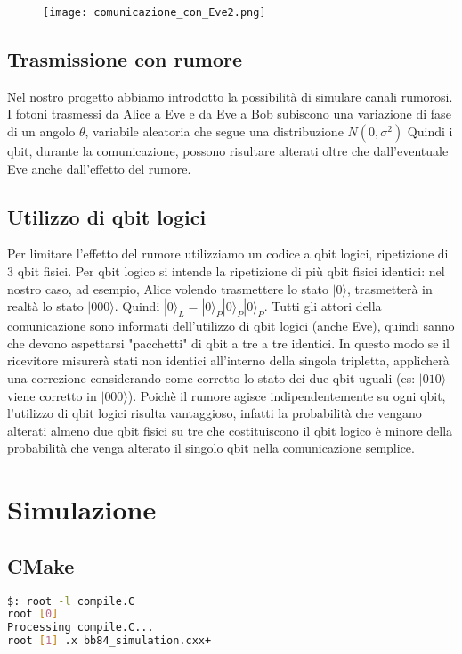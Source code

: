 \documentclass[11 pt, a4paper]{article}
\begin{document}
\begin{figure}[htbp!]
\centering
\texttt{[image: comunicazione\_con\_Eve2.png]}
\end{figure}

\subsection{Trasmissione con rumore}
Nel nostro progetto abbiamo introdotto la possibilità di simulare canali rumorosi. I fotoni trasmessi da Alice a Eve e da Eve a Bob subiscono una variazione di fase di un angolo $\theta$, variabile aleatoria che segue una distribuzione $N(0,\sigma^2)$
Quindi i qbit, durante la comunicazione, possono risultare alterati oltre che dall'eventuale Eve anche dall'effetto del rumore.

\subsection{Utilizzo di qbit logici}
Per limitare l'effetto del rumore utilizziamo un codice a qbit logici, ripetizione di 3 qbit fisici.
Per qbit logico si intende la ripetizione di più qbit fisici identici: nel nostro caso, ad esempio, Alice volendo trasmettere lo stato $|0\rangle$, trasmetterà in realtà lo stato $|000\rangle$. Quindi $|0\rangle_L = |0\rangle_P|0\rangle_P|0\rangle_P$.
Tutti gli attori della comunicazione sono informati dell'utilizzo di qbit logici (anche Eve), quindi sanno che devono aspettarsi "pacchetti" di qbit a tre a tre identici. In questo modo se il ricevitore misurerà stati non identici all'interno della singola tripletta, applicherà una correzione considerando come corretto lo stato dei due qbit uguali (es: $|010\rangle$ viene corretto in $|000\rangle$).
Poichè il rumore agisce indipendentemente su ogni qbit, l'utilizzo di qbit logici risulta vantaggioso, infatti la probabilità che vengano alterati almeno due qbit fisici su tre che costituiscono il qbit logico è minore della probabilità che venga alterato il singolo qbit nella comunicazione semplice.

\section{Simulazione}
\subsection{CMake}

\begin{lstlisting}[language=bash, style=myRoot]
$: root -l compile.C
root [0] 
Processing compile.C...
root [1] .x bb84_simulation.cxx+
\end{lstlisting}
\end{document}

